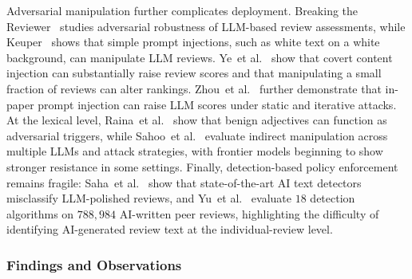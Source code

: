 \documentclass{llmxive}
\providecommand{\etal}{et al.\xspace}
\begin{document}
Adversarial manipulation further complicates deployment. Breaking the Reviewer~\cite{breakingreviewer2025} studies adversarial robustness of LLM-based review assessments, while Keuper~\cite{promptinjectionreview2025} shows that simple prompt injections, such as white text on a white background, can manipulate LLM reviews. Ye~\etal~\cite{ye2024peerrisks} show that covert content injection can substantially raise review scores and that manipulating a small fraction of reviews can alter rankings. Zhou~\etal~\cite{zhou2025positiveprompt} further demonstrate that in-paper prompt injection can raise LLM scores under static and iterative attacks. At the lexical level, Raina~\etal~\cite{raina2024adversarialjudge} show that benign adjectives can function as adversarial triggers, while Sahoo~\etal~\cite{sahoo2025indirect} evaluate indirect manipulation across multiple LLMs and attack strategies, with frontier models beginning to show stronger resistance in some settings. Finally, detection-based policy enforcement remains fragile: Saha~\etal~\cite{reviewpolicyenforce2026} show that state-of-the-art AI text detectors misclassify LLM-polished reviews, and Yu~\etal~\cite{aidetectionreview2025} evaluate $18$ detection algorithms on $788{,}984$ AI-written peer reviews, highlighting the difficulty of identifying AI-generated review text at the individual-review level.






\subsubsection{Findings and Observations}
\label{sec:s6_findings}
\end{document}
